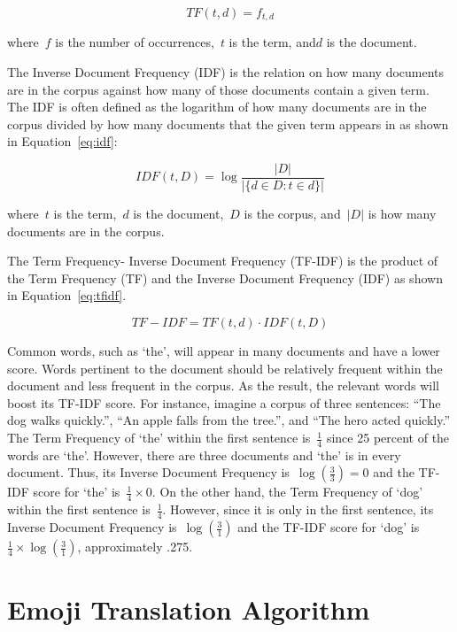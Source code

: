 \documentclass{article}[10]
\begin{document}
\begin{equation}
  TF(t, d) = f_{t, d} \label{eq:tf}
\end{equation}

where~\(f\) is the number of occurrences,~\(t\) is the term, and\(d\) is
the document.

The Inverse Document Frequency (IDF) is the relation on how many
documents are in the corpus against how many of those documents contain
a given term. The IDF is often defined as the logarithm of how many
documents are in the corpus divided by how many documents that the given
term appears in as shown in Equation~\eqref{eq:idf}:

\begin{equation}
  IDF(t, D) = \log\frac{|D|}{|\{d \in D : t \in d\}|} \label{eq:idf}
\end{equation}

where~\(t\) is the term,~\(d\) is the
document,~\(D\) is the corpus, and~\(\left|D\right|\) is
how many documents are in the corpus.

The Term Frequency- Inverse Document Frequency (TF-IDF) is the product
of the Term Frequency (TF) and the Inverse Document Frequency (IDF) as
shown in Equation~\eqref{eq:tfidf}.

\begin{equation}
  TF-IDF= TF(t, d) \cdot IDF(t, D) \label{eq:tfidf}
\end{equation}

Common words, such as `the', will appear in many documents and have a
lower score. Words pertinent to the document should be relatively
frequent within the document and less frequent in the corpus. As the
result, the relevant words will boost its TF-IDF score. For instance,
imagine a corpus of three sentences: ``The dog walks quickly.'', ``An
apple falls from the tree.'', and ``The hero acted quickly.'' The Term
Frequency of `the' within the first sentence is~\(\frac{1}{4}\)
since 25 percent of the words are `the'. However, there are three
documents and `the' is in every document. Thus, its Inverse Document
Frequency is~\(\log(\frac{3}{3}) = 0\) and the TF-IDF score for `the'
is~\(\frac{1}{4} \times 0\). On the other hand, the Term Frequency of `dog'
within the first sentence is~\(\frac{1}{4}\). However, since it is
only in the first sentence, its Inverse Document Frequency
is~\(\log(\frac{3}{1})\) and the TF-IDF score for `dog'
is~\(\frac{1}{4} \times \log(\frac{3}{1})\), approximately .275.

\section{Emoji Translation Algorithm\label{sec:EmojiTranslationAlgorithm}}
\end{document}
